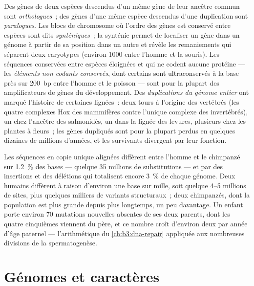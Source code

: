 \begin{definition}\label{def:b3:genomics:comparative}
Des gènes de deux espèces descendus d'un même gène de leur ancêtre
commun sont \emph{orthologues}~; des gènes d'une même espèce descendus
d'une duplication sont \emph{paralogues}. Les blocs de chromosome où
l'ordre des gènes est conservé entre espèces sont dits
\emph{synténiques}~; la synténie permet de localiser un gène dans un
génome à partir de sa position dans un autre et révèle les remaniements
qui séparent deux caryotypes (environ \num{1000} entre l'homme et la
souris). Les séquences conservées entre espèces éloignées et qui ne
codent aucune protéine --- les \emph{éléments non codants conservés},
dont certains sont ultraconservés à la base près sur \qty{200}{bp}
entre l'homme et le poisson --- sont pour la plupart des amplificateurs
de gènes du développement. Des \emph{duplications du génome entier} ont
marqué l'histoire de certaines lignées~: deux tours à l'origine des
vertébrés (les quatre complexes Hox des mammifères contre l'unique
complexe des invertébrés), un chez l'ancêtre des salmonidés, un dans la
lignée des levures, plusieurs chez les plantes à fleurs~; les gènes
dupliqués sont pour la plupart perdus en quelques dizaines de millions
d'années, et les survivants divergent par leur fonction.
\end{definition}

\begin{example}\label{ex:b3:genomics:chimp}
Les séquences en copie unique alignées diffèrent entre l'homme et le
chimpanzé sur \qty{1.2}{\%} des bases --- quelque \num{35} millions de
substitutions --- et par des insertions et des délétions qui totalisent
encore \qty{3}{\%} de chaque génome. Deux humains diffèrent à raison
d'environ une base sur mille, soit quelque \numrange{4}{5} millions de
sites, plus quelques milliers de variants structuraux~; deux
chimpanzés, dont la population est plus grande depuis plus longtemps,
un peu davantage. Un enfant porte environ \num{70} mutations nouvelles
absentes de ses deux parents, dont les quatre cinquièmes viennent du
père, et ce nombre croît d'environ deux par année d'âge paternel ---
l'arithmétique du \cref{ch:b3:dna-repair} appliquée aux nombreuses
divisions de la spermatogenèse.
\end{example}

\section{Génomes et caractères}

